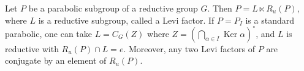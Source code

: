 Let $P$ be a parabolic subgroup of a reductive group $G$. Then $P = L \ltimes R_u(P)$, where $L$ is a reductive subgroup, called a Levi factor. If $P = P_I$ is a standard parabolic, one can take $L = C_G(Z)$ where $Z = (\bigcap_{\alpha \in I} \operatorname{Ker} \alpha)^\circ$, and $L$ is reductive with $R_u(P) \cap L = e$. Moreover, any two Levi factors of $P$ are conjugate by an element of $R_u(P)$.
